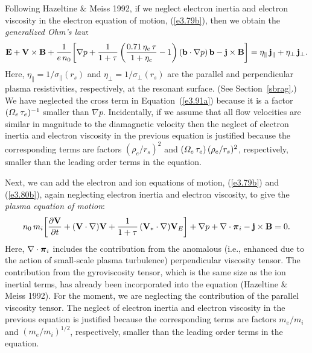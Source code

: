 \documentclass[notitlepage,12pt]{article}
\newcommand{\bpi}{\mbox{\boldmath$\pi$}}
\begin{document}
Following Hazeltine \& Meiss 1992, if we neglect electron inertia and electron viscosity  in the electron equation of motion, (\ref{e3.79b}), then
we obtain the {\em generalized Ohm's law}: 
\begin{equation}\label{e220}
{\bf E} + {\bf V}\times {\bf B} + \frac{1}{e\,n_0}\!\left[\nabla p + \frac{1}{1+\tau}\left(\frac{0.71\,\eta_e\,\tau}{1+\eta_e}-1\right)({\bf b}\cdot\nabla p)\,{\bf b} -{\bf j}\times{\bf B}\right] = \eta_\parallel\,{\bf j}_\parallel + \eta_\perp\,{\bf j}_\perp.
\end{equation}
Here, $\eta_\parallel=1/\sigma_\parallel(r_s)$ and $\eta_\perp=1/\sigma_\perp(r_s)$ are the parallel and perpendicular plasma
resistivities,  respectively, at the resonant surface. (See Section~\ref{sbrag}.) We have neglected the cross term in Equation~(\ref{e3.91a})
because it is a factor $({\mit\Omega}_e\,\tau_e)^{-1}$  smaller than $\nabla p$. Incidentally, if we assume that all
flow velocities are similar in magnitude to the diamagnetic velocity then the neglect of
electron inertia and electron viscosity in the previous equation is justified because the corresponding terms are factors
$(\rho_e/r_s)^2$ and $({\mit\Omega}_e\,\tau_e)\,(\rho_e/r_s)^2$, respectively, smaller than the leading order terms
in the equation. 

Next, we can add the electron and ion equations of motion, (\ref{e3.79b}) and (\ref{e3.80b}), again neglecting electron inertia and electron viscosity, 
to give the {\em plasma equation of motion}: 
\begin{equation}
n_0\,m_i\!\left[\frac{\partial {\bf V}}{\partial t} + ({\bf V}\cdot\nabla ){\bf V} + \frac{1}{1+\tau}\,({\bf V}_\ast\cdot\nabla){\bf V}_E\right]
+ \nabla p + \nabla\cdot\bpi_i - {\bf j}\times {\bf B}= 0.
\end{equation}
Here, $\nabla\cdot\bpi_i$ includes the contribution from the anomalous (i.e., enhanced due to the action of small-scale plasma turbulence) perpendicular viscosity tensor. The contribution from the gyroviscosity tensor,
which is the same size as the ion inertial terms, has already been incorporated into the equation (Hazeltine \& Meiss 1992). For the moment, we are neglecting the contribution of the parallel viscosity tensor. The neglect of electron inertia and electron viscosity in the previous equation is justified because
the corresponding terms are factors $m_e/m_i$ and $(m_e/m_i)^{1/2}$, respectively, smaller than the leading order
terms in the equation. 
\end{document}
